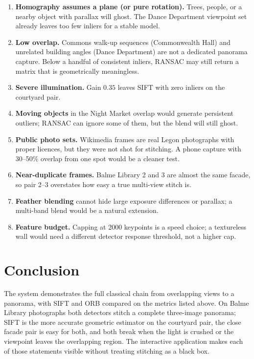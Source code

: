 \documentclass[10pt,twocolumn,letterpaper]{article}
\begin{document}
\begin{enumerate}
\item \textbf{Homography assumes a plane (or pure rotation).} Trees, people, or a nearby object with parallax will ghost. The Dance Department viewpoint set already leaves too few inliers for a stable model.
\item \textbf{Low overlap.} Commons walk-up sequences (Commonwealth Hall) and unrelated building angles (Dance Department) are not a dedicated panorama capture. Below a handful of consistent inliers, RANSAC may still return a matrix that is geometrically meaningless.
\item \textbf{Severe illumination.} Gain $0.35$ leaves SIFT with zero inliers on the courtyard pair.
\item \textbf{Moving objects} in the Night Market overlap would generate persistent outliers; RANSAC can ignore some of them, but the blend will still ghost.
\item \textbf{Public photo sets.} Wikimedia frames are real Legon photographs with proper licences, but they were not shot for stitching. A phone capture with 30--50\% overlap from one spot would be a cleaner test.
\item \textbf{Near-duplicate frames.} Balme Library 2 and 3 are almost the same facade, so pair 2--3 overstates how easy a true multi-view stitch is.
\item \textbf{Feather blending} cannot hide large exposure differences or parallax; a multi-band blend would be a natural extension.
\item \textbf{Feature budget.} Capping at 2000 keypoints is a speed choice; a textureless wall would need a different detector response threshold, not a higher cap.
\end{enumerate}

\section{Conclusion}

The system demonstrates the full classical chain from overlapping views to a panorama, with SIFT and ORB compared on the metrics listed above. On Balme Library photographs both detectors stitch a complete three-image panorama; SIFT is the more accurate geometric estimator on the courtyard pair, the close facade pair is easy for both, and both break when the light is crushed or the viewpoint leaves the overlapping region. The interactive application makes each of those statements visible without treating stitching as a black box.

{\small


}
\end{document}
